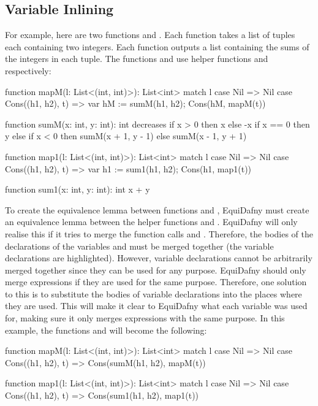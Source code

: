 \subsection{Variable Inlining}\label{sec:var-inlining}

For example, here are two functions  and . Each function takes a list of tuples each containing two integers. Each function outputs a list containing the sums of the integers in each tuple. The functions  and  use helper functions  and  respectively:
\begin{dafny}[highlightlines={5,22}]
function mapM(l: List<(int, int)>): List<int> {
  match l {
    case Nil => Nil
    case Cons((h1, h2), t) => 
      var hM := sumM(h1, h2);
      Cons(hM, mapM(t))
  }
}

function sumM(x: int, y: int): int
  decreases if x > 0 then x else -x
{
  if x == 0 then y
  else if x < 0 then sumM(x + 1, y - 1)
  else sumM(x - 1, y + 1)
}

function map1(l: List<(int, int)>): List<int> {
  match l {
    case Nil => Nil
    case Cons((h1, h2), t) => 
      var h1 := sum1(h1, h2);
      Cons(h1, map1(t))
  }
}

function sum1(x: int, y: int): int {
  x + y
}
\end{dafny}
%
To create the equivalence lemma between functions  and , EquiDafny must create an equivalence lemma between the helper functions  and . EquiDafny will only realise this if it tries to merge the function calls  and . Therefore, the bodies of the declarations of the variables  and  must be merged together (the variable declarations are highlighted). However, variable declarations cannot be arbitrarily merged together since they can be used for any purpose. EquiDafny should only merge expressions if they are used for the same purpose. Therefore, one solution to this is to substitute the bodies of variable declarations into the places where they are used. This will make it clear to EquiDafny what each variable was used for, making sure it only merges expressions with the same purpose. In this example, the functions  and  will become the following:
\begin{dafny}
function mapM(l: List<(int, int)>): List<int> {
  match l {
    case Nil => Nil
    case Cons((h1, h2), t) => Cons(sumM(h1, h2), mapM(t))
  }
}

function map1(l: List<(int, int)>): List<int> {
  match l {
    case Nil => Nil
    case Cons((h1, h2), t) => Cons(sum1(h1, h2), map1(t))
  }
}
\end{dafny}
